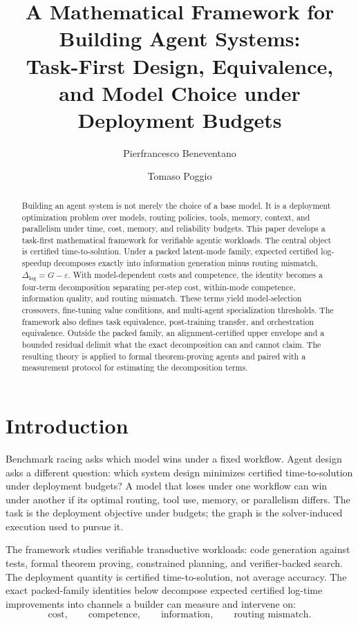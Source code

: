 \documentclass[10pt]{article}
\title{A Mathematical Framework for Building Agent Systems:\\
Task-First Design, Equivalence, and Model Choice under Deployment Budgets}
\author{Pierfrancesco Beneventano \and Tomaso Poggio}
\date{}
\theoremstyle{paperplain}
\theoremstyle{paperdefinition}
\theoremstyle{paperremark}
\newcommand{\Dlog}{\Delta_{\log}}
\begin{document}
\maketitle

\begin{abstract}
Building an agent system is not merely the choice of a base model. It is a deployment optimization problem over models, routing policies, tools, memory, context, and parallelism under time, cost, memory, and reliability budgets. This paper develops a task-first mathematical framework for verifiable agentic workloads. The central object is certified time-to-solution. Under a packed latent-mode family, expected certified log-speedup decomposes exactly into information generation minus routing mismatch, $\Dlog=G-\varepsilon$. With model-dependent costs and competence, the identity becomes a four-term decomposition separating per-step cost, within-mode competence, information quality, and routing mismatch. These terms yield model-selection crossovers, fine-tuning value conditions, and multi-agent specialization thresholds. The framework also defines task equivalence, post-training transfer, and orchestration equivalence. Outside the packed family, an alignment-certified upper envelope and a bounded residual delimit what the exact decomposition can and cannot claim. The resulting theory is applied to formal theorem-proving agents and paired with a measurement protocol for estimating the decomposition terms.
\end{abstract}

\section{Introduction}
\label{sec:intro}

Benchmark racing asks which model wins under a fixed workflow. Agent design asks a different question: which system design minimizes certified time-to-solution under deployment budgets? A model that loses under one workflow can win under another if its optimal routing, tool use, memory, or parallelism differs. The task is the deployment objective under budgets; the graph is the solver-induced execution used to pursue it.

The framework studies verifiable transductive workloads: code generation against tests, formal theorem proving, constrained planning, and verifier-backed search. The deployment quantity is certified time-to-solution, not average accuracy. The exact packed-family identities below decompose expected certified log-time improvements into channels a builder can measure and intervene on:
\[
\text{cost},\qquad \text{competence},\qquad \text{information},\qquad \text{routing mismatch}.
\]
\end{document}
